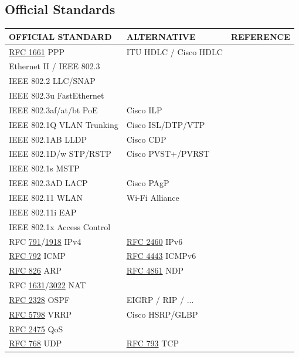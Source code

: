 \documentclass[12pt]{article}
\newcommand{\rfc}[1]{\href{https://datatracker.ietf.org/doc/html/rfc#1}{#1}}
\newcommand{\RFC}[1]{\href{https://datatracker.ietf.org/doc/html/rfc#1}{RFC #1}}
\begin{document}
	\subsection{Official Standards \label{subsec:STANDARDS}}
	\begin{table}[H]
	\centering
	\begin{tabular}{llr}
	\textbf{OFFICIAL STANDARD}	& \textbf{ALTERNATIVE}		& \textbf{REFERENCE}\\\hline
	\RFC{1661} PPP			& ITU HDLC / Cisco HDLC	& \Cref{subsec:ITU HDLC,subsec:IETF PPP}\\
	Ethernet II / IEEE 802.3		&					& \Cref{subsec:802.3 ETHERNET}\\
	IEEE 802.2 LLC/SNAP		&					& \Cref{tab:802.2 LLC,tab:802.2 SNAP}\\
	IEEE 802.3u FastEthernet		&					& \Cref{subsec:CABLING}\\
	IEEE 802.3af/at/bt PoE		& Cisco ILP				& \Cref{tab:POE}\\\hline
	IEEE 802.1Q VLAN Trunking	& Cisco ISL/DTP/VTP		& \Cref{subsec:VLAN TAGGING,subsec:CISCO VTP}\\
	IEEE 802.1AB LLDP		& Cisco CDP			& \Cref{subsec:CDP/802.1AB}\\
	IEEE 802.1D/w STP/RSTP		& Cisco PVST+/PVRST		& \Cref{subsec:802.1D/w}\\
	IEEE 802.1s MSTP			&					&\\
	IEEE 802.3AD LACP		& Cisco PAgP			&\\\hline
	IEEE 802.11 WLAN			& Wi-Fi Alliance			& \Cref{subsec:802.11 WLANS}\\
	IEEE 802.11i EAP			& 					& \Cref{fig:WIRELESS SECURITY}\\
	IEEE 802.1x Access Control	&					& \Cref{fig:WIRELESS SECURITY}\\\hline
	RFC \rfc{791}/\rfc{1918} IPv4	& \RFC{2460} IPv6		& \Cref{subsec:IPV4,subsec:IPV6}\\
	\RFC{792} ICMP			& \RFC{4443} ICMPv6		& \Cref{subsec:ICMP}\\
	\RFC{826} ARP			& \RFC{4861} NDP		& \Cref{subsec:ARP,subsec:NDP}\\
	RFC \rfc{1631}/\rfc{3022} NAT	&					&\\
	\RFC{2328} OSPF			& EIGRP / RIP / ...			& \Cref{subsec:OSPF}\\
	\RFC{5798} VRRP			& Cisco HSRP/GLBP		&\\
	\RFC{2475} QoS			&					& \Cref{sec:QOS}\\\hline
	\RFC{768} UDP			& \RFC{793} TCP			& \Cref{subsec:UDP,subsec:TCP}\\\hline

\end{tabular}
\end{table}
\end{document}
